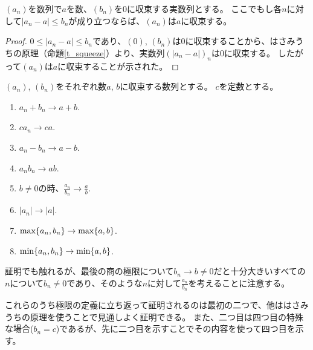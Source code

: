 \begin{corollary}
\label{t_squeeze2}
$(a_n)$を数列で$a$を数、$(b_n)$を$0$に収束する実数列とする。
ここでもし各$n$に対して$|a_n-a| \le b_n$が成り立つならば、$(a_n)$は$a$に収束する。
\end{corollary}

\begin{proof}
$0 \le |a_n-a| \le b_n$であり、$(0)$, $(b_n)$は$0$に収束することから、はさみうちの原理（命題\ref{t_squeeze}）より、実数列$(|a_n-a|)_n$は$0$に収束する。
したがって$(a_n)$は$a$に収束することが示された。
\end{proof}

\begin{proposition}[極限と四則演算]
$(a_n)$, $(b_n)$をそれぞれ数$a$, $b$に収束する数列とする。
$c$を定数とする。
\begin{enumerate}
\item
$a_n+b_n \to a+b$.
\item
$c a_n \to c a$.
\item
$a_n-b_n \to a-b$.
\item
$a_n b_n \to a b$.
\item
$b \ne 0$の時、$\frac{a_n}{b_n} \to \frac{a}{b}$.
\item
$|a_n| \to |a|$.
\item
$\max\{ a_n, b_n \} \to \max\{ a, b \}$.
\item
$\min\{ a_n, b_n \} \to \min\{ a, b \}$.
\end{enumerate}
\end{proposition}

\begin{remark}
証明でも触れるが、最後の商の極限について$b_n \to b \ne 0$だと十分大きいすべての$n$について$b_n \ne 0$であり、そのような$n$に対して$\frac{a_n}{b_n}$を考えることに注意する。
\end{remark}

これらのうち極限の定義に立ち返って証明されるのは最初の二つで、他ははさみうちの原理を使うことで見通しよく証明できる。
また、二つ目は四つ目の特殊な場合($b_n = c$)であるが、先に二つ目を示すことでその内容を使って四つ目を示す。


